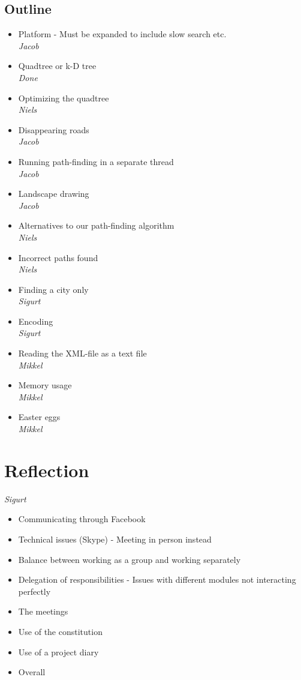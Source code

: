 \documentclass[a4paper,11pt]{article}
\begin{document}
\subsection{Outline}
\begin{itemize}
	\item Platform - Must be expanded to include slow search etc. \\
		\textsl{Jacob}
	\item Quadtree or k-D tree \\
		\textsl{Done}
	\item Optimizing the quadtree \\
		\textsl{Niels}
	\item Disappearing roads \\
		\textsl{Jacob}
	\item Running path-finding in a separate thread \\
		\textsl{Jacob}
	\item Landscape drawing \\
		\textsl{Jacob}
	\item Alternatives to our path-finding algorithm \\
		\textsl{Niels}
	\item Incorrect paths found \\
		\textsl{Niels}
	\item Finding a city only \\
		\textsl{Sigurt}
	\item Encoding \\
		\textsl{Sigurt}
	\item Reading the XML-file as a text file \\
		\textsl{Mikkel}
	\item Memory usage \\
		\textsl{Mikkel}
	\item Easter eggs \\
		\textsl{Mikkel}
\end{itemize}


\pagebreak
\section{Reflection}
\textsl{Sigurt}
\begin{itemize}
	\item Communicating through Facebook
	\item Technical issues (Skype) - Meeting in person instead
	\item Balance between working as a group and working separately
	\item Delegation of responsibilities - Issues with different modules not interacting perfectly
	\item The meetings
	\item Use of the constitution
	\item Use of a project diary
	\item Overall
\end{itemize}
\end{document}
